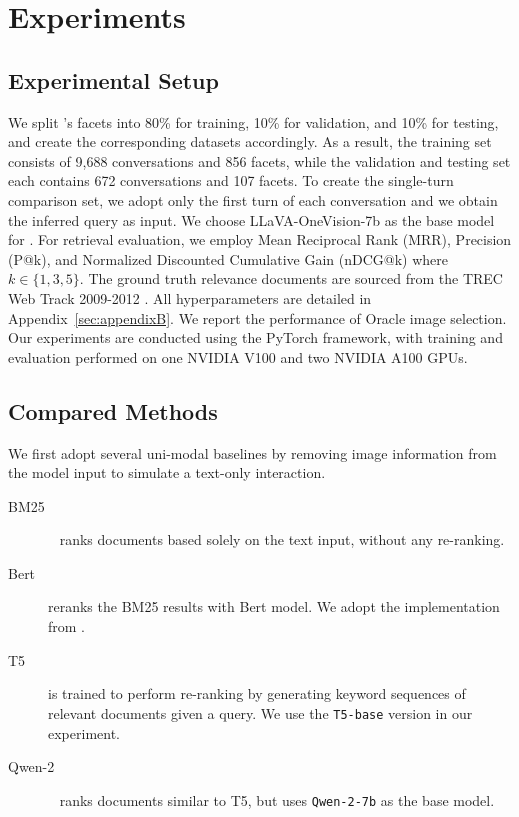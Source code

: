 \documentclass[11pt]{article}
\begin{document}
\section{Experiments}


\subsection{Experimental Setup}
We split \OurData{}'s facets into 80\% for training, 10\% for validation, and 10\% for testing, and create the corresponding datasets accordingly. As a result, the training set consists of 9,688 conversations and 856 facets, while the validation and testing set each contains 672 conversations and 107 facets. To create the single-turn comparison set, we adopt only the first turn of each conversation and we obtain the inferred query as input. We choose LLaVA-OneVision-7b as the base model for \OurModel{}. For retrieval evaluation, we employ Mean Reciprocal Rank (MRR), Precision (P@k), and Normalized Discounted Cumulative Gain (nDCG@k) where $k \in \{1,3,5\}$. The ground truth relevance documents are sourced from the TREC Web Track 2009-2012 \cite{trec2009,trec2012}. All hyperparameters are detailed in Appendix~\ref{sec:appendixB}. We report the performance of Oracle image selection. Our experiments are conducted using the PyTorch framework, with training and evaluation performed on one NVIDIA V100 and two NVIDIA A100 GPUs.



\subsection{Compared Methods}

We first adopt several uni-modal baselines by removing image information from the model input to simulate a text-only interaction.



\begin{description}

    \item [BM25]~\cite{Robertson2009BM25} ranks documents based solely on the text input, without any re-ranking.
    \item [Bert] \cite{Devlin2019BERTPO} reranks the BM25 results with Bert model. We adopt the implementation from \citet{MacAvaney2019CEDRCE}.
    \item [T5] \cite{DBLP:T5} is trained to perform re-ranking by generating keyword sequences of relevant documents given a query. We use the \verb|T5-base| version in our experiment.

    \item [Qwen-2]~\cite{qwen2} 
 ranks documents similar to T5, but uses \verb|Qwen-2-7b| as the base model.
    \end{description}
\end{document}
